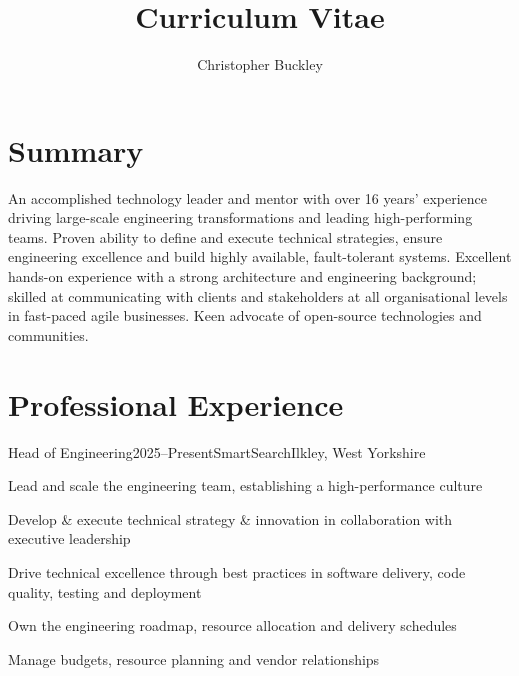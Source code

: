 \documentclass{cv}
\title{Curriculum Vitae}
\author{Christopher Buckley}
\begin{document}

\section{Summary}

An accomplished technology leader and mentor with over 16 years' experience driving large-scale
engineering transformations and leading high-performing teams. Proven ability to define and execute
technical strategies, ensure engineering excellence and build highly available, fault-tolerant
systems. Excellent hands-on experience with a strong architecture and engineering background;
skilled at communicating with clients and stakeholders at all organisational levels in fast-paced
agile businesses. Keen advocate of open-source technologies and communities.


\section{Professional Experience}

\begin{experience}{Head of Engineering}{2025--Present}{SmartSearch}{Ilkley, West Yorkshire}
\item Lead and scale the engineering team, establishing a high-performance culture
\item Develop \& execute technical strategy \& innovation in collaboration with executive leadership
\item Drive technical excellence through best practices in software delivery, code quality, testing and deployment
\item Own the engineering roadmap, resource allocation and delivery schedules
\item Manage budgets, resource planning and vendor relationships
\end{experience}
\end{document}
